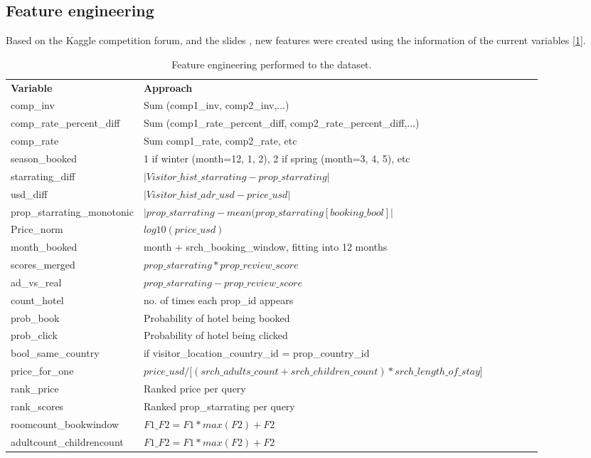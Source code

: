 \documentclass[9pt]{llncs}
\begin{document}
\subsection{Feature engineering}
Based on the Kaggle competition forum, and the slides \cite{Kaggle21646,Kaggle21588,Kaggle21607}
, new features were created using the information of the current variables [\ref{featengi}]. 

\begin{table}
\tiny
\centering
\caption{Feature engineering performed to the dataset.}
\begin{tabular}{lllllll}
\hline\noalign{\smallskip}
\textbf{Variable} & \textbf{Approach} \\
\noalign{\smallskip}
\hline
\noalign{\smallskip}
comp\_inv & Sum (comp1\_inv, comp2\_inv,...)\\
comp\_rate\_percent\_diff& Sum (comp1\_rate\_percent\_diff, comp2\_rate\_percent\_diff,...) \\
comp\_rate& Sum comp1\_rate, comp2\_rate, etc\\
season\_booked & 1 if winter (month=12, 1, 2), 2 if spring (month=3, 4, 5), etc\\ 
starrating\_diff & $|Visitor\_hist\_starrating - prop\_starrating |$ \\ 
usd\_diff & $|Visitor\_hist\_adr\_usd - price\_usd|$ \\
prop\_starrating\_monotonic & $|prop\_starrating - mean(prop\_starrating[booking\_bool]|$ \\
Price\_norm & $log10(price\_usd)$\\
month\_booked & month + srch\_booking\_window, fitting into 12 months\\
scores\_merged& $prop\_starrating * prop\_review\_score$\\
ad\_vs\_real & $prop\_starrating - prop\_review\_score$\\
count\_hotel & no. of times each prop\_id appears\\ 
prob\_book & Probability of hotel being booked\\
prob\_click & Probability of hotel being clicked\\ 
bool\_same\_country & if visitor\_location\_country\_id = prop\_country\_id \\
price\_for\_one & $price\_usd / [(srch\_adults\_count + srch\_children\_count) * srch\_length\_of\_stay$]
\\
rank\_price & Ranked price per query\\
rank\_scores & Ranked prop\_starrating per query\\
roomcount\_bookwindow & $F1\_F2 = F1*max(F2) + F2$\\
adultcount\_childrencount & $F1\_F2 = F1*max(F2) + F2$\\
\hline
\end{tabular}
\label{featengi}
\end{table}
\end{document}
